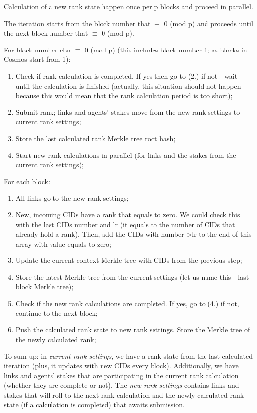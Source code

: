 \documentclass[8pt,oneside]{amsart}
\newcommand{\code}[1]{{\PlayBold #1}}
\begin{document}
\begin{Abstract}
Calculation of a new rank state happen once per \code{p} blocks and proceed in parallel.

The iteration starts from the block number that \code{$\equiv$ 0 (mod p)} and proceeds until the next block number that \code{$\equiv$ 0 (mod p)}.

For block number \code{cbn $\equiv$ 0 (mod p)} (this includes block number 1; as blocks in Cosmos start from 1):

\begin{enumerate}
  \item Check if rank calculation is completed. If yes then go to (2.) if not - wait until the calculation is finished
  (actually, this situation should not happen because this would mean that the rank calculation period is too short);
  \item Submit rank; links and agents' stakes move from the new rank settings to current rank settings;
  \item Store the last calculated rank Merkle tree root hash;
  \item Start new rank calculations in parallel (for links and the stakes from the current rank settings);
\end{enumerate}

For each block:

\begin{enumerate}
  \item All links go to the new rank settings;
  \item New, incoming CIDs have a rank that equals to zero. We could check this with the last CIDs number and \code{lr} (it equals to the number of CIDs that already hold a rank). Then, add the CIDs with number \code{>lr} to the end of this array with value equals to zero;
  \item Update the current context Merkle tree with CIDs from the previous step;
  \item Store the latest Merkle tree from the current settings (let us name this - last block Merkle tree);
  \item Check if the new rank calculations are completed. If yes, go to (4.) if not, continue to the next block;
  \item Push the calculated rank state to new rank settings. Store the Merkle tree of the newly calculated rank;
\end{enumerate}
To sum up: in \textit{current rank settings}, we have a rank state from the last calculated iteration (plus, it updates with new CIDs every block). Additionally, we have links and agents' stakes that are participating in the current rank calculation (whether they are complete or not). The \textit{new rank settings} contains links and stakes that will roll to the next rank calculation and the newly calculated rank state (if a calculation is completed) that awaits submission.


\end{Abstract}
\end{document}
